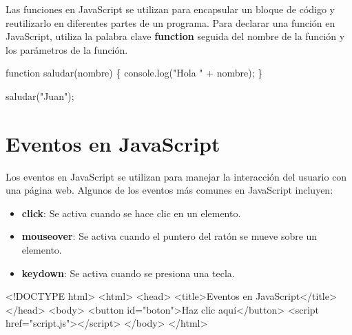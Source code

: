\documentclass[
  a4paper,
  DIV=11,
  numbers=noendperiod,
  onepage,
  openany]{scrreprt}
\newenvironment{Shaded}{\begin{snugshade}}{\end{snugshade}}
\newcommand{\BuiltInTok}[1]{\textcolor[rgb]{0.00,0.23,0.31}{#1}}
\newcommand{\DataTypeTok}[1]{\textcolor[rgb]{0.68,0.00,0.00}{#1}}
\newcommand{\FunctionTok}[1]{\textcolor[rgb]{0.28,0.35,0.67}{#1}}
\newcommand{\KeywordTok}[1]{\textcolor[rgb]{0.00,0.23,0.31}{#1}}
\newcommand{\NormalTok}[1]{\textcolor[rgb]{0.00,0.23,0.31}{#1}}
\newcommand{\OperatorTok}[1]{\textcolor[rgb]{0.37,0.37,0.37}{#1}}
\newcommand{\OtherTok}[1]{\textcolor[rgb]{0.00,0.23,0.31}{#1}}
\newcommand{\StringTok}[1]{\textcolor[rgb]{0.13,0.47,0.30}{#1}}
\providecommand{\tightlist}{%
  \setlength{\itemsep}{0pt}\setlength{\parskip}{0pt}}\usepackage{longtable,booktabs,array}
\begin{document}
Las funciones en JavaScript se utilizan para encapsular un bloque de
código y reutilizarlo en diferentes partes de un programa. Para declarar
una función en JavaScript, utiliza la palabra clave \textbf{function}
seguida del nombre de la función y los parámetros de la función.

\begin{Shaded}
\begin{Highlighting}[]
\KeywordTok{function} \FunctionTok{saludar}\NormalTok{(nombre) \{}
    \BuiltInTok{console}\OperatorTok{.}\FunctionTok{log}\NormalTok{(}\StringTok{"Hola "} \OperatorTok{+}\NormalTok{ nombre)}\OperatorTok{;}
\NormalTok{\}}

\FunctionTok{saludar}\NormalTok{(}\StringTok{"Juan"}\NormalTok{)}\OperatorTok{;}
\end{Highlighting}
\end{Shaded}

\section{Eventos en JavaScript}\label{eventos-en-javascript}

Los eventos en JavaScript se utilizan para manejar la interacción del
usuario con una página web. Algunos de los eventos más comunes en
JavaScript incluyen:

\begin{itemize}
\tightlist
\item
  \textbf{click}: Se activa cuando se hace clic en un elemento.
\item
  \textbf{mouseover}: Se activa cuando el puntero del ratón se mueve
  sobre un elemento.
\item
  \textbf{keydown}: Se activa cuando se presiona una tecla.
\end{itemize}

\begin{Shaded}
\begin{Highlighting}[]
\DataTypeTok{\textless{}!DOCTYPE }\NormalTok{html}\DataTypeTok{\textgreater{}}
\DataTypeTok{\textless{}}\KeywordTok{html}\DataTypeTok{\textgreater{}}
\DataTypeTok{\textless{}}\KeywordTok{head}\DataTypeTok{\textgreater{}}
    \DataTypeTok{\textless{}}\KeywordTok{title}\DataTypeTok{\textgreater{}}\NormalTok{Eventos en JavaScript}\DataTypeTok{\textless{}/}\KeywordTok{title}\DataTypeTok{\textgreater{}}
\DataTypeTok{\textless{}/}\KeywordTok{head}\DataTypeTok{\textgreater{}}
\DataTypeTok{\textless{}}\KeywordTok{body}\DataTypeTok{\textgreater{}}
    \DataTypeTok{\textless{}}\KeywordTok{button}\OtherTok{ id}\OperatorTok{=}\StringTok{"boton"}\DataTypeTok{\textgreater{}}\NormalTok{Haz clic aquí}\DataTypeTok{\textless{}/}\KeywordTok{button}\DataTypeTok{\textgreater{}}
    \DataTypeTok{\textless{}}\KeywordTok{script}\OtherTok{ href}\OperatorTok{=}\StringTok{"script.js"}\DataTypeTok{\textgreater{}\textless{}/}\KeywordTok{script}\DataTypeTok{\textgreater{}}
\DataTypeTok{\textless{}/}\KeywordTok{body}\DataTypeTok{\textgreater{}}
\DataTypeTok{\textless{}/}\KeywordTok{html}\DataTypeTok{\textgreater{}}
\end{Highlighting}
\end{Shaded}
\end{document}
